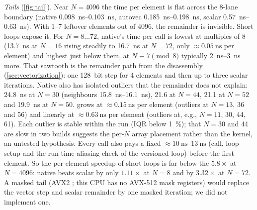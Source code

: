 \emph{Tails} (\cref{fig:tail}). Near $N=\num{4096}$ the time per element is flat across the
\num{8}-lane boundary (native \qtyrange{0.098}{0.103}{\nano\second}, autovec
\qtyrange{0.185}{0.198}{\nano\second}, scalar \qtyrange{0.57}{0.63}{\nano\second}). With
\numrange{1}{7} leftover elements out of \num{4096}, the remainder is invisible. Short loops expose
it. For $N=8\ldots72$, native's time per call is lowest at multiples of \num{8}
(\qty{13.7}{\nano\second} at $N=16$ rising steadily to \qty{16.7}{\nano\second} at $N=72$, only
$\approx\qty{0.05}{\nano\second}$ per element) and highest just below them, at $N\equiv7 \pmod 8$
typically \qtyrange{2}{3}{\nano\second} more. That sawtooth is the remainder path from the
disassembly (\cref{sec:vectorization}): one \qty{128}{bit} step for \num{4} elements and then up to
three scalar iterations. Native also has isolated outliers that the remainder does not explain:
\qty{24.8}{\nano\second} at $N=30$ (neighbours \qtyrange{15.8}{16.1}{\nano\second}),
\num{21.6} at $N=44$, \num{21.1} at $N=52$ and \qty{19.9}{\nano\second} at $N=50$.
 grows at $\approx\qty{0.15}{\nano\second}$ per element (outliers at $N=13$, \num{36}
and \num{56}) and  linearly at $\approx\qty{0.63}{\nano\second}$ per element (outliers
at, e.g., $N=11$, \num{30}, \num{44}, \num{61}). Each outlier is stable within the run (IQR below
\SI{1}{\percent}); that $N=30$ and \num{44} are slow in two builds suggests the per-$N$ array
placement rather than the kernel, an untested hypothesis. Every call also pays a fixed $\approx\qtyrange{10}{13}{\nano\second}$ (call,
loop setup and the run-time aliasing check of the versioned loop) before the first element. So the
per-element speedup of short loops is far below the $5.8\times$ at $N=\num{4096}$: native beats
scalar by only $1.11\times$ at $N=8$ and by $3.32\times$ at $N=72$. A masked tail (AVX2
; this CPU has no AVX-512 mask registers) would replace the vector step and scalar
remainder by one masked iteration; we did not implement one.
